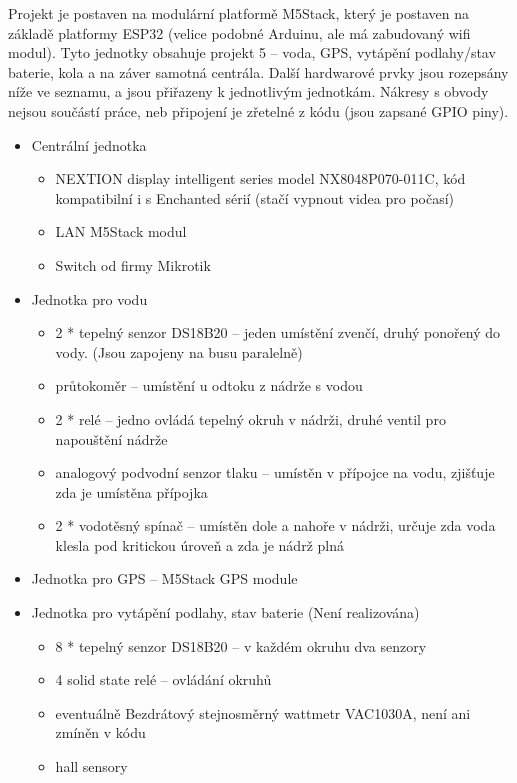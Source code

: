 \documentclass[a4paper,oneside,12pt]{report}
\begin{document}
Projekt je postaven na modulární platformě M5Stack, který je postaven na základě platformy ESP32 (velice podobné Arduinu, ale má zabudovaný wifi modul).
Tyto jednotky obsahuje projekt 5 -- voda, GPS, vytápění podlahy/stav baterie, kola a na záver samotná centrála.
Další hardwarové prvky jsou rozepsány níže ve seznamu, a jsou přiřazeny k jednotlivým jednotkám.
Nákresy s obvody nejsou součástí práce, neb připojení je zřetelné z kódu (jsou zapsané GPIO piny).
\begin{itemize}
	\item Centrální jednotka
		\begin{itemize}
			\item NEXTION display intelligent series model NX8048P070-011C, kód kompatibilní i s Enchanted sérií (stačí vypnout videa pro počasí)
			\item LAN M5Stack modul
			\item Switch od firmy Mikrotik
	\end{itemize}
	\item Jednotka pro vodu
		\begin{itemize}
			\item 2 * tepelný senzor DS18B20 -- jeden umístění zvenčí, druhý ponořený do vody. (Jsou zapojeny na busu paralelně)
			\item průtokoměr -- umístění u odtoku z nádrže s vodou
			\item 2 * relé -- jedno ovládá tepelný okruh v nádrži, druhé ventil pro napouštění nádrže
			\item analogový podvodní senzor tlaku -- umístěn v přípojce na vodu, zjišťuje zda je umístěna přípojka
			\item 2 * vodotěsný spínač -- umístěn dole a nahoře v nádrži, určuje zda voda klesla pod kritickou úroveň a zda je nádrž plná
		\end{itemize}
	\item Jednotka pro GPS -- M5Stack GPS module
	\item Jednotka pro vytápění podlahy, stav baterie (Není realizována)
		\begin{itemize}
			\item 8 * tepelný senzor DS18B20 -- v každém okruhu dva senzory
			\item 4 solid state relé -- ovládání okruhů
			\item eventuálně Bezdrátový stejnosměrný wattmetr VAC1030A, není ani zmíněn v kódu
			\item hall sensory
		\end{itemize}
\end{itemize}
\end{document}
